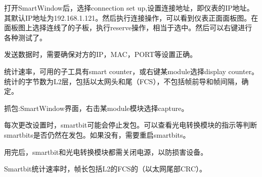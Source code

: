 打开SmartWindow后，选择connection set up,设置连接地址，即仪表的IP地址。其默认IP地址为192.168.1.121。然后执行连接操作，可以看到仪表正面面板图。在面板图上选择连线了的子板，执行reserve操作，相当于选中。然后可以右键进行各种测试了。

发送数据时，需要确保对方的IP，MAC，PORT等设置正确。

统计速率，可用的子工具有smart counter，或右键某module选择display counter。统计的字节数为L2层，包括以太网头和尾（FCS），不包括帧前导和帧间隔，确定。

抓包:SmartWindow界面，右击某module模块选择capture。

每次更改设置时，smartbit可能会停止发包。可以查看光电转换模块的指示等判断smartbits是否仍然在发包。如果没有，需要重启smartbits。

用完后，smartbit和光电转换模块都需关闭电源，以防损害设备。

Smartbit统计速率时，帧长包括L2的FCS的（以太网尾部CRC）。













